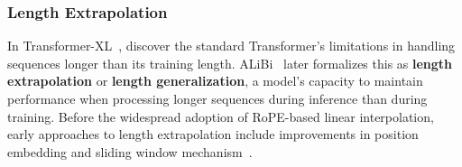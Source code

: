 \subsubsection{Length Extrapolation}
In Transformer-XL~\citep{dai2019transformer}, discover the standard Transformer's limitations in handling sequences longer than its training length. ALiBi~\citep{presstrain} later formalizes this as \textbf{length extrapolation} or \textbf{length generalization}, a model's capacity to maintain performance when processing longer sequences during inference than during training.
Before the widespread adoption of RoPE-based linear interpolation, early approaches to length extrapolation include improvements in position embedding and sliding window mechanism~\citep{presstrain,sun2022length,ratner2022parallel}.

